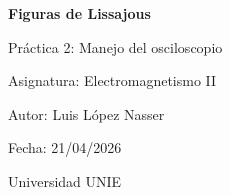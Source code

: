 \documentclass[12pt,a4paper]{article}
\begin{document}
\begin{titlepage}
    \centering
    \vspace*{3cm}
    {\LARGE\bfseries Figuras de Lissajous\par}
    \vspace{0.5cm}
    {\large Práctica 2: Manejo del osciloscopio\par}
    \vspace{1.2cm}
    {\large Asignatura: Electromagnetismo II\par}
    \vspace{0.4cm}
    {\large Autor: Luis López Nasser\par}
    \vspace{0.2cm}
    {\large Fecha: 21/04/2026\par}
    \vspace{0.2cm}
    {\large Universidad UNIE\par}
    \vfill
\end{titlepage}

\tableofcontents
\clearpage
\end{document}
